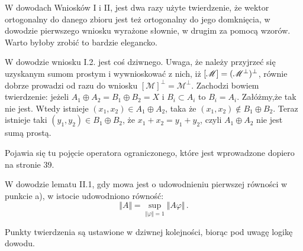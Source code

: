 \documentclass[a4paper,11pt]{article}
\begin{document}
\vspace{\spaceFour}



 W dowodach Wniosków I i II, jest dwa razy użyte
twierdzenie, że wektor ortogonalny do danego zbioru jest też
ortogonalny do jego domknięcia, w dowodzie pierwszego wniosku
wyrażone słownie, w drugim za pomocą wzorów. Warto byłoby zrobić to
bardzie elegancko.

\vspace{\spaceFour}



 W dowodzie wniosku I.2. jest coś dziwnego. Uwaga, że
należy przyjrzeć się uzyskanym sumom prostym i wywnioskować z nich,
iż $[ \mathcal{M} ]=( \mathcal{M}^{ \bot } )^{ \bot }$, równie
dobrze prowadzi od razu do wniosku
$[ \mathcal{ M } ]^{ \bot } = \mathcal{ M }^{ \bot }$. Zachodzi
bowiem twierdzenie: jeżeli
$A_{ 1 } \oplus A_{ 2 } = B_{ 1 } \oplus B_{ 2 } = X$ i
$B_{ i } \subset A_{ i }$ to $B_{ i } = A_{ i }$. Załóżmy,że tak nie
jest. Wtedy istnieje
$( x_{ 1 }, x_{ 2 } ) \in A_{ 1 } \oplus A_{ 2 }$, taka że
$( x_{ 1 }, x_{ 2 } ) \notin B_{ 1 } \oplus B_{ 2 }$. Teraz istnieje
taki $( y_{ 1 }, y_{ 2 } ) \in B_{ 1 } \oplus B_{ 2 }$, że
$x_{ 1 } + x_{ 2 } = y_{ 1 } + y_{ 2 }$, czyli
$A_{ 1 } \oplus A_{ 2 }$ nie jest sumą prostą.

\vspace{\spaceFour}



 Pojawia się tu pojęcie operatora ograniczonego, które
jest wprowadzone dopiero na stronie 39.

\vspace{\spaceFour}



 W dowodzie lematu II.1, gdy mowa jest o udowodnieniu
pierwszej równości w punkcie a), w istocie udowodniono równość:
\begin{equation}
  \label{eq:GrabowskiIngarden-01}
  \Vert A \Vert = \sup_{ \Vert \varphi \Vert = 1 } \Vert A \varphi \Vert \, .
\end{equation}

\vspace{\spaceFour}



 Punkty twierdzenia są ustawione w dziwnej kolejności,
biorąc pod uwagę logikę dowodu.

\vspace{\spaceFour}
\end{document}
